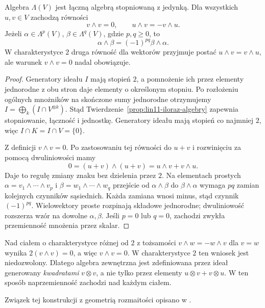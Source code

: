 \begin{stwierdzenie}
\label{prop:lin11-wedge-znaki}
Algebra \(\Lambda(V)\) jest łączną
algebrą stopniowaną z jedynką.
Dla wszystkich \(u,v\in V\)
zachodzą równości
\[
 v\wedge v=0,\qquad
 u\wedge v=-v\wedge u.
\]
Jeżeli \(\alpha\in\Lambda^p(V)\),
\(\beta\in\Lambda^q(V)\), gdzie
\(p,q\geq0\), to
\[
 \alpha\wedge\beta
 =(-1)^{pq}\beta\wedge\alpha.
\]
W charakterystyce \(2\)
druga równość dla wektorów
przyjmuje postać
\(u\wedge v=v\wedge u\), ale
warunek \(v\wedge v=0\)
nadal obowiązuje.
\end{stwierdzenie}
\begin{proof}
Generatory ideału \(I\) mają
stopień \(2\), a pomnożenie
ich przez elementy jednorodne
z obu stron daje elementy
o określonym stopniu.
Po rozłożeniu ogólnych
mnożników na skończone sumy
jednorodne otrzymujemy
\(I=\bigoplus_k(I\cap V^{\otimes k})\).
Stąd
Twierdzenie~\ref{prop:lin11-iloraz-algebry}
zapewnia stopniowanie,
łączność i jednostkę.
Generatory ideału mają stopień
co najmniej \(2\), więc
\(I\cap K=I\cap V=\{0\}\).

Z definicji \(v\wedge v=0\).
Po zastosowaniu tej równości
do \(u+v\) i rozwinięciu
za pomocą dwuliniowości mamy
\[
 0=(u+v)\wedge(u+v)
  =u\wedge v+v\wedge u.
\]
Daje to regułę zmiany znaku
bez dzielenia przez \(2\).
Na elementach prostych
\(\alpha=v_1\wedge\cdots\wedge v_p\)
i \(\beta=w_1\wedge\cdots\wedge w_q\)
przejście od \(\alpha\wedge\beta\)
do \(\beta\wedge\alpha\) wymaga
\(pq\) zamian kolejnych
czynników sąsiednich.
Każda zamiana wnosi minus,
stąd czynnik \((-1)^{pq}\).
Wielowektory proste rozpinają
składowe jednorodne; dwuliniowość
rozszerza wzór na dowolne
\(\alpha,\beta\).
Jeśli \(p=0\) lub \(q=0\),
zachodzi zwykła przemienność
mnożenia przez skalar.
\end{proof}

\begin{uwaga}
\label{rem:lin11-char2}
Nad ciałem o charakterystyce
różnej od \(2\) z tożsamości
\(v\wedge w=-w\wedge v\)
dla \(v=w\) wynika
\(2(v\wedge v)=0\), a więc
\(v\wedge v=0\).
W charakterystyce \(2\)
ten wniosek jest niedozwolony.
Dlatego algebra zewnętrzna
jest zdefiniowana przez ideał
generowany \emph{kwadratami}
\(v\otimes v\), a nie tylko
przez elementy
\(u\otimes v+v\otimes u\).
W ten sposób naprzemienność
zachodzi nad każdym ciałem.
\end{uwaga}

Związek tej konstrukcji z geometrią rozmaitości opisano w .

